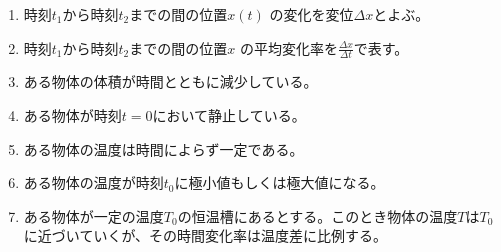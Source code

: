 \documentclass[twocolumn,11pt]{jarticle}
\begin{document}
\begin{enumerate}
\item\label{ditem:displaycement} 時刻$t_1$から時刻$t_2$までの間の位置$x(t)$
  の変化を変位$\Delta x$とよぶ。
\item\label{ditem:avrvel} 時刻$t_1$から時刻$t_2$までの間の位置$x$
  の平均変化率を$\displaystyle\frac{\Delta x}{\Delta t}$で表す。
\item\label{ditem:dV>0} ある物体の体積が時間とともに減少している。
\item\label{ditem:v=0} ある物体が時刻$t=0$において静止している。
\item\label{ditem:dT=0} ある物体の温度は時間によらず一定である。
\item\label{ditem:dT(t0)=0}
  ある物体の温度が時刻$t_0$に極小値もしくは極大値になる。
\item\label{ditem:dT} ある物体が一定の温度$T_0$の恒温槽にあるとする。このとき物体の温度$T$は$T_0$に近づいていくが、その時間変化率は温度差に比例する。
\end{enumerate}
\end{document}
